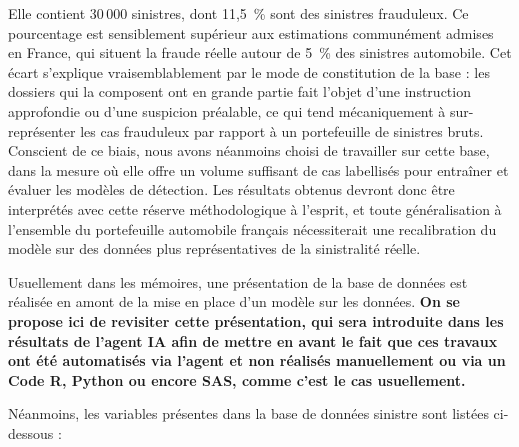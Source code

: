 Elle contient 30\,000 sinistres, dont 11,5~\% sont des sinistres frauduleux. Ce pourcentage est sensiblement supérieur aux estimations communément admises en France, qui situent la fraude réelle autour de 5~\% des sinistres automobile. Cet écart s'explique vraisemblablement par le mode de constitution de la base : les dossiers qui la composent ont en grande partie fait l'objet d'une instruction approfondie ou d'une suspicion préalable, ce qui tend mécaniquement à sur-représenter les cas frauduleux par rapport à un portefeuille de sinistres bruts. Conscient de ce biais, nous avons néanmoins choisi de travailler sur cette base, dans la mesure où elle offre un volume suffisant de cas labellisés pour entraîner et évaluer les modèles de détection. Les résultats obtenus devront donc être interprétés avec cette réserve méthodologique à l'esprit, et toute généralisation à l'ensemble du portefeuille automobile français nécessiterait une recalibration du modèle sur des données plus représentatives de la sinistralité réelle.

Usuellement dans les mémoires, une présentation de la base de données est réalisée en amont de la mise en place d'un modèle sur les données. \textbf{On se propose ici de revisiter cette présentation, qui sera introduite dans les résultats de l'agent IA afin de mettre en avant le fait que ces travaux ont été automatisés via l'agent et non réalisés manuellement ou via un Code R, Python ou encore SAS, comme c'est le cas usuellement.}

Néanmoins, les variables présentes dans la base de données sinistre sont listées ci-dessous :

\renewcommand{\_}{\char`_\allowbreak}

